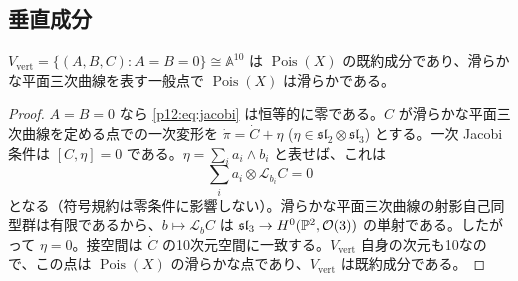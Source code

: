 \subsection{垂直成分}
\begin{theorem}\label{p12:th:vertical}
 $V_{\mathrm{vert}}=\{(A,B,C):A=B=0\}\cong\mathbb{A}^{10}$ は $\operatorname{Pois}(X)$ の既約成分であり、滑らかな平面三次曲線を表す一般点で $\operatorname{Pois}(X)$ は滑らかである。
\end{theorem}
\begin{proof}
 $A=B=0$ なら \eqref{p12:eq:jacobi} は恒等的に零である。$C$ が滑らかな平面三次曲線を定める点での一次変形を $\dot\pi=\dot C+\eta$ ($\eta\in\mathfrak{sl}_2\otimes\mathfrak{sl}_3$) とする。一次 Jacobi 条件は
 $[C,\eta]=0$ である。$\eta=\sum_i a_i\wedge b_i$ と表せば、これは
 \[
 \sum_i a_i\otimes\mathcal L_{b_i} C=0
 \]
 となる（符号規約は零条件に影響しない）。滑らかな平面三次曲線の射影自己同型群は有限であるから、$b\mapsto\mathcal L_bC$ は $\mathfrak{sl}_3\to H^0(\mathbb P^2,\mathcal O(3))$ の単射である。したがって $\eta=0$。接空間は $\dot C$ の10次元空間に一致する。$V_{\mathrm{vert}}$ 自身の次元も10なので、この点は $\operatorname{Pois}(X)$ の滑らかな点であり、$V_{\mathrm{vert}}$ は既約成分である。
\end{proof}

